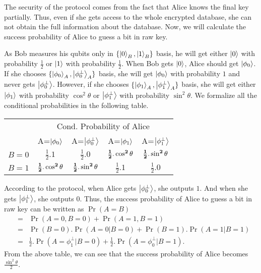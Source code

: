 \documentclass[twocolumn,pra,aps,amssymb]{revtex4}
\begin{document}
The security of the protocol comes from the fact that Alice knows the final key partially. Thus, even if she gets  access to the whole encrypted database, she can not obtain the full information about the database. 
Now, we will calculate the success probability of Alice to guess a bit in raw key.

As Bob measures his qubits only in $\{\left|0\right\rangle_{B}, \left|1\right\rangle_{B}\}$ basis, he will get either $\left|0\right\rangle$ with probability $\frac{1}{2}$
or $\left|1\right\rangle$ with probability $\frac{1}{2}$. When Bob gets $\left|0\right\rangle$, Alice should get $\left|\phi_0\right\rangle$. If she chooses $\{\left|\phi_0\right\rangle_{A}, \left|\phi_0^{\perp}\right\rangle_{A}\}$ basis, she will get $\left|\phi_0\right\rangle$ with probability $1$ and never gets $\left|\phi_0^{\perp}\right\rangle$. However, if she chooses $\{\left|\phi_1\right\rangle_{A}, \left|\phi_1^{\perp}\right\rangle_{A}\}$ basis, she will get either $\left|\phi_1\right\rangle$ with probability $\cos^2\theta$ or $\left|\phi_1^{\perp}\right\rangle$ with probability $\sin^2\theta$. We formalize all the conditional probabilities in the following table.

{\scriptsize
\begin{center}
\begin{tabular}{|c|c|c|c|c|}
\hline
 & \multicolumn{4}{|c|}{Cond. Probability of Alice}\\
\cline{2-5}
& A=$\left|\phi_0\right\rangle$ & A=$\left|\phi_0^{\perp}\right\rangle$ & A=$\left|\phi_1\right\rangle$ & A=$\left|\phi_1^{\perp}\right\rangle$\\
\hline
$ B=0 $ & $\frac{1}{2}.1$&$\frac{1}{2}.0$ &$\bf{\frac{1}{2}.\cos^2\theta}$ & $\bf{\frac{1}{2}.\sin^2\theta}$\\
\hline
$B=1$ & $\bf{\frac{1}{2}.\cos^2\theta}$ & $\bf{\frac{1}{2}.\sin^2\theta}$ &$\frac{1}{2}.1$ &$\frac{1}{2}.0$\\
\hline
\end{tabular}
\end{center}}

According to the protocol, when Alice gets $\left|\phi_0^{\perp}\right\rangle$, she outputs $1$. And when she gets $\left|\phi_1^{\perp}\right\rangle$, she outputs $0$. Thus, the success probability of Alice to guess a bit in raw key can be written as 
{\scriptsize
$\Pr(A=B)$
\begin{eqnarray}
\label{sucprob}
&=&\Pr(A=0,B=0)+\Pr(A=1,B=1) \nonumber\\
&=&\Pr(B=0).\Pr(A=0|B=0)+\Pr(B=1).\Pr(A=1|B=1)\\
&=&\frac{1}{2}.\Pr(A=\phi_1^{\perp}|B=0)+\frac{1}{2}.\Pr(A=\phi_0^{\perp}|B=1). \nonumber
\end{eqnarray}}
From the above table, we can see that the success probability of Alice becomes $\frac{\sin^2\theta}{2}$.%
\end{document}
